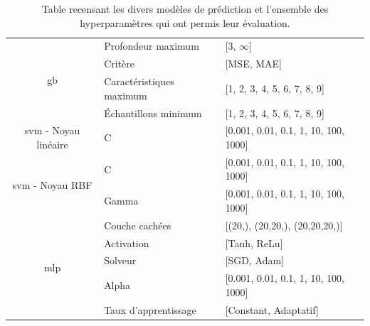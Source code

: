 \begin{table}[H]
\begin{tabular}{cll}
        \multirow{4}{*}{\gls{gb}}                       & Profondeur maximum        & [3, $\infty$]                             \\ \cmidrule{2-3}
                                                        & Critère                   & [MSE, MAE]                                \\ \cmidrule{2-3} 
                                                        & Caractéristiques maximum  & [1, 2, 3, 4, 5, 6, 7, 8, 9]               \\ \cmidrule{2-3}   
                                                        & Échantillons minimum      & [1, 2, 3, 4, 5, 6, 7, 8, 9]               \\ \midrule 
        \gls{svm} - Noyau linéaire                      & C                         & [0.001, 0.01, 0.1, 1, 10, 100, 1000]      \\ \midrule
        \multirow{2}{*}{\gls{svm} - Noyau RBF}          & C                         & [0.001, 0.01, 0.1, 1, 10, 100, 1000]      \\ \cmidrule{2-3}      
                                                        & Gamma                     & [0.001, 0.01, 0.1, 1, 10, 100, 1000]      \\ \midrule 
        \multirow{5}{*}{\gls{mlp}}                      & Couche cachées            & [(20,), (20,20,), (20,20,20,)]            \\ \cmidrule{2-3}
                                                        & Activation                & [Tanh, ReLu]                              \\ \cmidrule{2-3}
                                                        & Solveur                   & [SGD, Adam]                               \\ \cmidrule{2-3}
                                                        & Alpha                     & [0.001, 0.01, 0.1, 1, 10, 100, 1000]      \\ \cmidrule{2-3}
                                                        & Taux d'apprentissage      & [Constant, Adaptatif]                     \\ \bottomrule 
    \end{tabular} 
    \label{tab:image_hyperparameters}
    \caption{Table recensant les divers modèles de prédiction et l'ensemble des hyperparamètres qui ont permis leur évaluation.}
\end{table}\par

